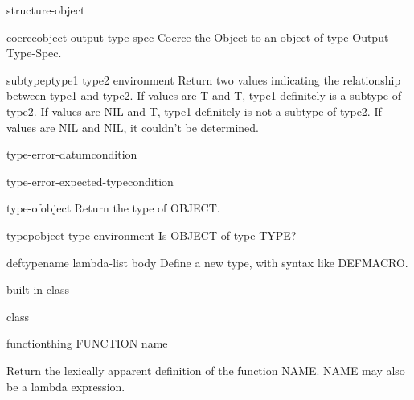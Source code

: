 \documentclass[10pt,english]{book}
\begin{document}
\begin{class}{structure-object}{}
  
\end{class}

\begin{function}{coerce}{object output-type-spec}
  Coerce the Object to an object of type Output-Type-Spec.
\end{function}

\begin{function}{subtypep}{type1 type2 \op environment}
  Return two values indicating the relationship between type1 and type2.
  If values are T and T, type1 definitely is a subtype of type2.
  If values are NIL and T, type1 definitely is not a subtype of type2.
  If values are NIL and NIL, it couldn't be determined.
\end{function}

\begin{function}{type-error-datum}{condition}
  
\end{function}

\begin{function}{type-error-expected-type}{condition}
  
\end{function}

\begin{function}{type-of}{object}
  Return the type of OBJECT.
\end{function}

\begin{function}{typep}{object type \op environment}
  Is OBJECT of type TYPE?
\end{function}

\begin{macro}{deftype}{name lambda-list \body body}
  Define a new type, with syntax like DEFMACRO.
\end{macro}

\begin{class}{built-in-class}{}
  
\end{class}

\begin{class}{class}{}
  
\end{class}

\begin{class}{function}{thing}
  FUNCTION name

Return the lexically apparent definition of the function NAME. NAME may also
be a lambda expression.
\end{class}
\end{document}

